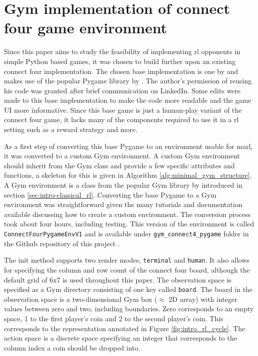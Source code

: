 
\section{Gym implementation of connect four game environment}
\label{sec:connect_four_rl-gym-environment}


Since this paper aims to study the feasibility of implementing \gls{rl} opponents in simple Python based games, it was chosen to build further upon an existing connect four implementation.
The chosen base implementation is one by \citet{base_connectfour_github} and makes use of the popular Pygame library by \citet{pygame}.
The author's permission of reusing his code was granted after brief communication on LinkedIn.
Some edits were made to this base implementation to make the code more readable and the game UI more informative. 
Since this base game is just a human-play variant of the connect four game, it lacks many of the components required to use it in a \gls{rl} setting such as a reward strategy and more.

As a first step of converting this base Pygame to an environment usable for \gls{marl}, it was converted to a custom Gym environment.
A custom Gym environment should inherit from the Gym class and provide a few specific attributes and functions, a skeleton for this is given in Algorithm \ref{alg:minimal_gym_structure}.
A Gym environment is a class from the popular Gym library by \citet{gym} introduced in section \ref{sec:intro-classical_rl}.
Converting the base Pygame to a Gym environment was straightforward given the many tutorials and documentation available discussing how to create a custom environment.
The conversion process took about four hours, including testing.
This version of the environment is called \texttt{ConnectFourPygameEnvV1} and is available under \texttt{gym\_connect4\_pygame} folder in the Github repository of this project \citep{github_project}. 

The init method supports two render modes, \texttt{terminal} and \texttt{human}.
It also allows for specifying the column and row count of the connect four board, although the default grid of 6x7 is used throughout this paper.
The observation space is specified as a Gym directory consisting of one key called \texttt{board}.
The board in the observation space is a two-dimensional Gym box ($\approx$ 2D array) with integer values between zero and two, including boundaries.
Zero corresponds to an empty space, 1 to the first player's coin and 2 to the second player's coin.
This corresponds to the representation annotated in Figure \ref{fig:intro_rl_cycle}.
The action space is a discrete space specifying an integer that corresponds to the column index a coin should be dropped into.

